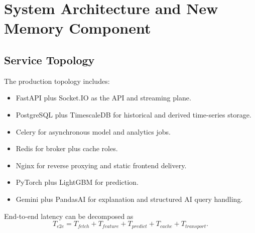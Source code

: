 \documentclass{article}
\begin{document}
\section{System Architecture and New Memory Component}
\subsection{Service Topology}
The production topology includes:
\begin{itemize}
\item FastAPI plus Socket.IO as the API and streaming plane.
\item PostgreSQL plus TimescaleDB for historical and derived time-series storage.
\item Celery for asynchronous model and analytics jobs.
\item Redis for broker plus cache roles.
\item Nginx for reverse proxying and static frontend delivery.
\item PyTorch plus LightGBM for prediction.
\item Gemini plus PandasAI for explanation and structured AI query handling.
\end{itemize}

End-to-end latency can be decomposed as
\begin{equation}
T_{e2e}=T_{fetch}+T_{feature}+T_{predict}+T_{cache}+T_{transport}.
\end{equation}
\end{document}
